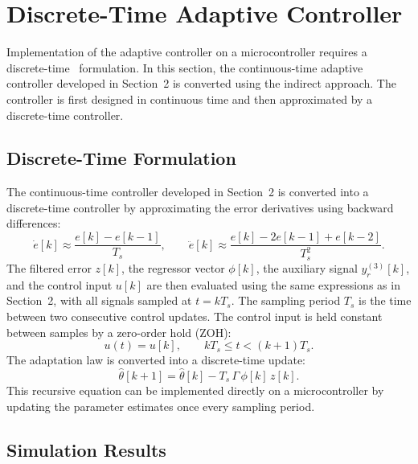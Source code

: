 \section{Discrete-Time Adaptive Controller}

Implementation of the adaptive controller on a microcontroller requires a discrete-time ~formulation. In this section, the continuous-time adaptive controller developed in Section~2 is converted using the indirect approach. The controller is first designed in continuous time and then approximated by a discrete-time controller.

\subsection{Discrete-Time Formulation}

The continuous-time controller developed in Section~2 is converted into a discrete-time controller by approximating the error derivatives using backward differences:
\begin{equation}
\dot{e}[k] \approx \frac{e[k]-e[k-1]}{T_s},
\qquad
\ddot{e}[k] \approx \frac{e[k]-2e[k-1]+e[k-2]}{T_s^2}.
\label{eq:discrete_bd}
\end{equation}
The filtered error \(z[k]\), the regressor vector \(\phi[k]\), the auxiliary signal \(y_r^{(3)}[k]\), and the control input \(u[k]\) are then evaluated using the same expressions as in Section~2, with all signals sampled at \(t=kT_s\). The sampling period \(T_s\) is the time between two consecutive control updates. The control input is held constant between samples by a zero-order hold (ZOH):
\begin{equation}
u(t) = u[k], \qquad kT_s \le t < (k+1)T_s.
\end{equation}
The adaptation law is converted into a discrete-time update:
\begin{equation}
\hat{\theta}[k+1]
=
\hat{\theta}[k]
-
T_s\,\Gamma\,\phi[k]\,z[k].
\label{eq:discrete_adaptation_law}
\end{equation}
This recursive equation can be implemented directly on a microcontroller by updating the parameter estimates once every sampling period.

\subsection{Simulation Results}

